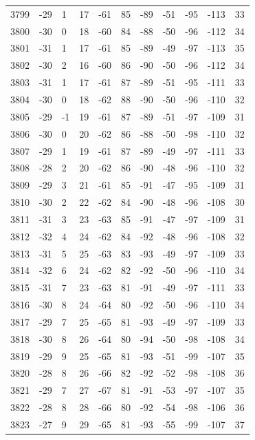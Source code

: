 \begin{table}[H]
\begin{tabular}{lllllllllll}
3799 & -29 & 1 & 17 & -61 & 85 & -89 & -51 & -95 & -113 & 33 \\
3800 & -30 & 0 & 18 & -60 & 84 & -88 & -50 & -96 & -112 & 34 \\
3801 & -31 & 1 & 17 & -61 & 85 & -89 & -49 & -97 & -113 & 35 \\
3802 & -30 & 2 & 16 & -60 & 86 & -90 & -50 & -96 & -112 & 34 \\
3803 & -31 & 1 & 17 & -61 & 87 & -89 & -51 & -95 & -111 & 33 \\
3804 & -30 & 0 & 18 & -62 & 88 & -90 & -50 & -96 & -110 & 32 \\
3805 & -29 & -1 & 19 & -61 & 87 & -89 & -51 & -97 & -109 & 31 \\
3806 & -30 & 0 & 20 & -62 & 86 & -88 & -50 & -98 & -110 & 32 \\
3807 & -29 & 1 & 19 & -61 & 87 & -89 & -49 & -97 & -111 & 33 \\
3808 & -28 & 2 & 20 & -62 & 86 & -90 & -48 & -96 & -110 & 32 \\
3809 & -29 & 3 & 21 & -61 & 85 & -91 & -47 & -95 & -109 & 31 \\
3810 & -30 & 2 & 22 & -62 & 84 & -90 & -48 & -96 & -108 & 30 \\
3811 & -31 & 3 & 23 & -63 & 85 & -91 & -47 & -97 & -109 & 31 \\
3812 & -32 & 4 & 24 & -62 & 84 & -92 & -48 & -96 & -108 & 32 \\
3813 & -31 & 5 & 25 & -63 & 83 & -93 & -49 & -97 & -109 & 33 \\
3814 & -32 & 6 & 24 & -62 & 82 & -92 & -50 & -96 & -110 & 34 \\
3815 & -31 & 7 & 23 & -63 & 81 & -91 & -49 & -97 & -111 & 33 \\
3816 & -30 & 8 & 24 & -64 & 80 & -92 & -50 & -96 & -110 & 34 \\
3817 & -29 & 7 & 25 & -65 & 81 & -93 & -49 & -97 & -109 & 33 \\
3818 & -30 & 8 & 26 & -64 & 80 & -94 & -50 & -98 & -108 & 34 \\
3819 & -29 & 9 & 25 & -65 & 81 & -93 & -51 & -99 & -107 & 35 \\
3820 & -28 & 8 & 26 & -66 & 82 & -92 & -52 & -98 & -108 & 36 \\
3821 & -29 & 7 & 27 & -67 & 81 & -91 & -53 & -97 & -107 & 35 \\
3822 & -28 & 8 & 28 & -66 & 80 & -92 & -54 & -98 & -106 & 36 \\
3823 & -27 & 9 & 29 & -65 & 81 & -93 & -55 & -99 & -107 & 37 \\

\end{tabular}
\end{table}
